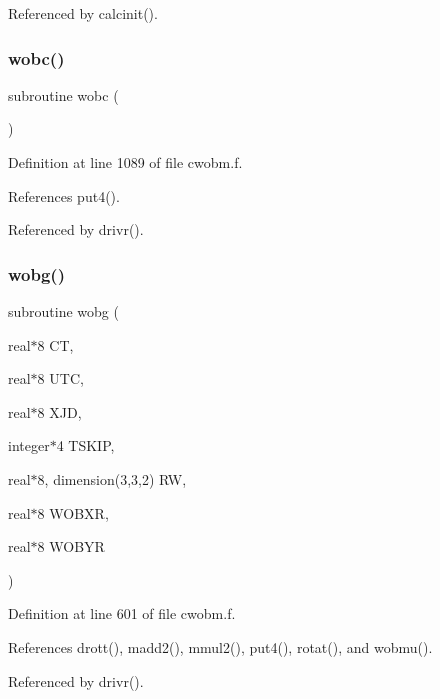 Referenced by calcinit().

\mbox{\label{cwobm_8f_a7d18c3ee22b833ad83b211801fc812ce}} 
\subsubsection{\texorpdfstring{wobc()}{wobc()}}
{\footnotesize\ttfamily subroutine wobc (\begin{DoxyParamCaption}{ }\end{DoxyParamCaption})}



Definition at line 1089 of file cwobm.\+f.



References put4().



Referenced by drivr().

\mbox{\label{cwobm_8f_a507aa03e4bee0f97b26c64a5797a6fba}} 
\subsubsection{\texorpdfstring{wobg()}{wobg()}}
{\footnotesize\ttfamily subroutine wobg (\begin{DoxyParamCaption}\item[{real$\ast$8}]{CT,  }\item[{real$\ast$8}]{U\+TC,  }\item[{real$\ast$8}]{X\+JD,  }\item[{integer$\ast$4}]{T\+S\+K\+IP,  }\item[{real$\ast$8, dimension(3,3,2)}]{RW,  }\item[{real$\ast$8}]{W\+O\+B\+XR,  }\item[{real$\ast$8}]{W\+O\+B\+YR }\end{DoxyParamCaption})}



Definition at line 601 of file cwobm.\+f.



References drott(), madd2(), mmul2(), put4(), rotat(), and wobmu().



Referenced by drivr().

\mbox{\label{cwobm_8f_a884da2eee8f670063f8d0f9b0af2f23e}} 
